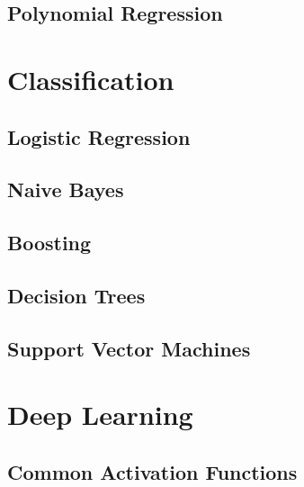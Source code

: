 \documentclass[18pt,a3paper,landscape, ncols=2]{cheatsheet}
\begin{document}
	\subsection{Polynomial Regression}
		\begin{mdframed}
		\end{mdframed}

\section{Classification} \seperator
	\subsection{Logistic Regression}
		\begin{mdframed}
		\end{mdframed}
	\subsection{Naive Bayes}
		\begin{mdframed}
		\end{mdframed}
	\subsection{Boosting}
		\begin{mdframed}
		\end{mdframed}
	\subsection{Decision Trees}
		\begin{mdframed}
		\end{mdframed}
	\subsection{Support Vector Machines}
		\begin{mdframed}
		\end{mdframed}
	
\newpage %

\section{Deep Learning} \seperator
	\subsection{Common Activation Functions}
		\begin{mdframed}
		\end{mdframed}
\end{document}
